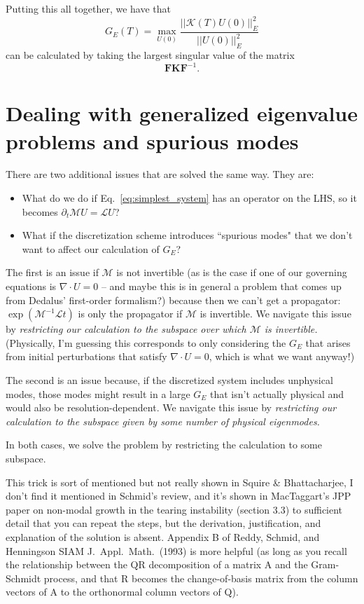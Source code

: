\documentclass[aps,pop,preprint]{revtex4}
\begin{document}
Putting this all together, we have that
\begin{equation}
G_E(T) = \max_{U(0)} \frac{||\mathcal{K}(T) U(0) ||_E^2}{||U(0)||_E^2}
\label{eq:energy_gain_def}
\end{equation}
can be calculated by taking the largest singular value of the matrix
\begin{equation}
\mathbf{F} \mathbf{K} \mathbf{F}^{-1}.
\label{eq:propagator_Enorm}
\end{equation}

\section{Dealing with generalized eigenvalue problems and spurious modes}
\label{sec:eigen-subspace}
There are two additional issues that are solved the same way. 
They are:
\begin{itemize}
\item[(1)] What do we do if Eq.~\eqref{eq:simplest_system} has an operator on the LHS, so it becomes $\partial_t \mathcal{M} U = \mathcal{L} U$?
\item[(2)] What if the discretization scheme introduces ``spurious modes" that we don't want to affect our calculation of $G_E$?
\end{itemize}

The first is an issue if $\mathcal{M}$ is not invertible (as is the case if one of our governing equations is $\nabla \cdot U = 0$ -- and maybe this is in general a problem that comes up from Dedalus' first-order formalism?) because then we can't get a propagator: $\exp(\mathcal{M}^{-1} \mathcal{L} t)$ is only the propagator if $\mathcal{M}$ is invertible. 
We navigate this issue by \textit{restricting our calculation to the subspace over which $\mathcal{M}$ is invertible.} 
(Physically, I'm guessing this corresponds to only considering the $G_E$ that arises from initial perturbations that satisfy $\nabla \cdot U = 0$, which is what we want anyway!)

The second is an issue because, if the discretized system includes unphysical modes, those modes might result in a large $G_E$ that isn't actually physical and would also be resolution-dependent. 
We navigate this issue by \textit{restricting our calculation to the subspace given by some number of physical eigenmodes.}

In both cases, we solve the problem by restricting the calculation to some subspace. 

This trick is sort of mentioned but not really shown in Squire \& Bhattacharjee, I don't find it mentioned in Schmid's review, and it's shown in MacTaggart's JPP paper on non-modal growth in the tearing instability (section 3.3) to sufficient detail that you can repeat the steps, but the derivation, justification, and explanation of the solution is absent. 
Appendix B of Reddy, Schmid, and Henningson SIAM J.~Appl.~Math.~(1993) is more helpful (as long as you recall the relationship between the QR decomposition of a matrix A and the Gram-Schmidt process, and that R becomes the change-of-basis matrix from the column vectors of A to the orthonormal column vectors of Q). 
\end{document}
